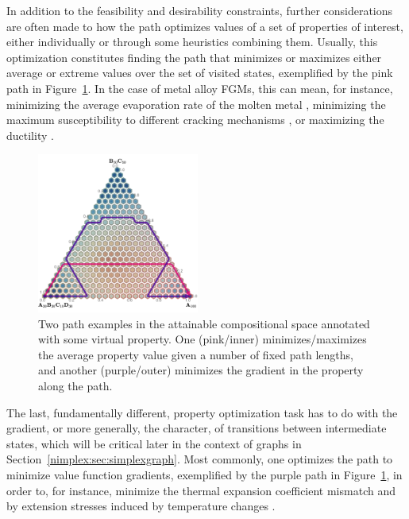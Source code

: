 In addition to the feasibility and desirability constraints, further considerations are often made to how the path optimizes values of a set of properties of interest, either individually or through some heuristics combining them. Usually, this optimization constitutes finding the path that minimizes or maximizes either average or extreme values over the set of visited states, exemplified by the pink path in Figure~\ref{nimplex:fig:pathplanning2}. In the case of metal alloy FGMs, this can mean, for instance, minimizing the average evaporation rate of the molten metal \cite{Mukherjee2016PrintabilityManufacturing}, minimizing the maximum susceptibility to different cracking mechanisms \cite{Yang2023DesignCracking}, or maximizing the ductility \cite{Hu2021ScreeningAlloys}.

\begin{figure}[H]
    \centering
    \includegraphics[width=0.475\textwidth]{nimplex/PathPlanning_2.png}
    \caption{Two path examples in the attainable compositional space annotated with some virtual property. One (pink/inner) minimizes/maximizes the average property value given a number of fixed path lengths, and another (purple/outer) minimizes the gradient in the property along the path.} 
    \label{nimplex:fig:pathplanning2}
\end{figure}

The last, fundamentally different, property optimization task has to do with the gradient, or more generally, the character, of transitions between intermediate states, which will be critical later in the context of graphs in Section~\ref{nimplex:sec:simplexgraph}. Most commonly, one optimizes the path to minimize value function gradients, exemplified by the purple path in Figure~\ref{nimplex:fig:pathplanning2}, in order to, for instance, minimize the thermal expansion coefficient mismatch and by extension stresses induced by temperature changes \cite{Kirk2021ComputationalMonotonicity}.




